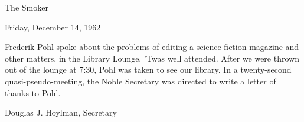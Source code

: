 \documentclass[12pt]{article}
\begin{document}
\begin{center}

The Smoker

Friday, December 14, 1962

\end{center}
 
\vspace{12pt}

\setlength{\parskip}{6pt}

\noindent
Frederik Pohl spoke about the problems of editing a science fiction magazine and other matters, in the Library Lounge. 'Twas well attended. After we were thrown out of the lounge at 7:30, Pohl was taken to see our library. In a twenty-second quasi-pseudo-meeting, the Noble Secretary was directed to write a letter of thanks to Pohl.

\vspace{12pt}

\centerline{Douglas J. Hoylman, Secretary}
\end{document}
